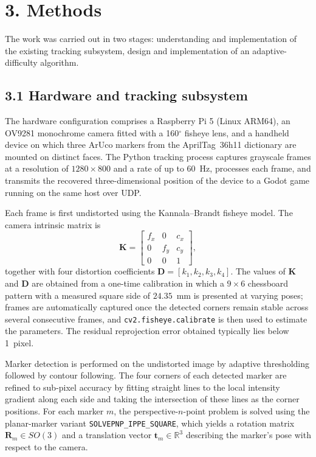 \documentclass[11pt,a4paper]{article}
\begin{document}
\section*{3. Methods}

The work was carried out in two stages: understanding and implementation of the existing tracking subsystem, design and implementation of an adaptive-difficulty algorithm.

\subsection*{3.1 Hardware and tracking subsystem}

The hardware configuration comprises a Raspberry Pi 5 (Linux ARM64), an OV9281 monochrome camera fitted with a 160$^\circ$ fisheye lens, and a handheld device on which three ArUco markers from the AprilTag~36h11 dictionary are mounted on distinct faces. The Python tracking process captures grayscale frames at a resolution of $1280 \times 800$ and a rate of up to 60~Hz, processes each frame, and transmits the recovered three-dimensional position of the device to a Godot game running on the same host over UDP.

Each frame is first undistorted using the Kannala--Brandt fisheye model. The camera intrinsic matrix is
\begin{equation}
    \mathbf{K} =
    \begin{bmatrix}
        f_x & 0   & c_x \\
        0   & f_y & c_y \\
        0   & 0   & 1
    \end{bmatrix},
\end{equation}
together with four distortion coefficients $\mathbf{D} = [k_1, k_2, k_3, k_4]$. The values of $\mathbf{K}$ and $\mathbf{D}$ are obtained from a one-time calibration in which a $9 \times 6$ chessboard pattern with a measured square side of $24.35$~mm is presented at varying poses; frames are automatically captured once the detected corners remain stable across several consecutive frames, and \texttt{cv2.fisheye.calibrate} is then used to estimate the parameters. The residual reprojection error obtained typically lies below 1~pixel.

Marker detection is performed on the undistorted image by adaptive thresholding followed by contour following. The four corners of each detected marker are refined to sub-pixel accuracy by fitting straight lines to the local intensity gradient along each side and taking the intersection of these lines as the corner positions. For each marker $m$, the perspective-$n$-point problem is solved using the planar-marker variant \texttt{SOLVEPNP\_IPPE\_SQUARE}, which yields a rotation matrix $\mathbf{R}_m \in SO(3)$ and a translation vector $\mathbf{t}_m \in \mathbb{R}^3$ describing the marker's pose with respect to the camera.
\end{document}

